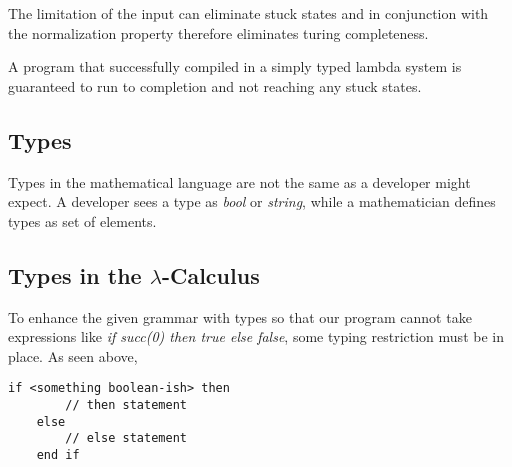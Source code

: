 


The limitation of the input can eliminate stuck states
and in conjunction with the normalization property \cite{pierce2002ProgLang} \cite{baader_nipkow_1998}
therefore eliminates turing completeness.

A program that successfully compiled in a simply typed
lambda system is guaranteed to run to completion and not
reaching any stuck states.

\subsection{Types}

Types in the mathematical language are not the same as a developer
might expect. A developer sees a type as \textit{bool} or \textit{string},
while a mathematician defines types as set of elements.



\subsection{Types in the $\lambda$-Calculus}

To enhance the given grammar with types so that our program
cannot take expressions like \textit{if succ(0) then true else false},
some typing restriction must be in place. As seen above,

\begin{lstlisting}[caption={If Condition},captionpos=b]
    if <something boolean-ish> then
        // then statement
    else
        // else statement
    end if
\end{lstlisting}

